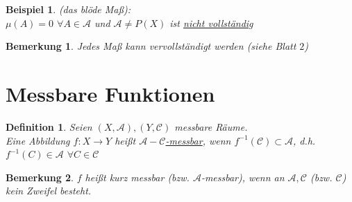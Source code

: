 \documentclass[11pt]{memoir}
\theoremstyle{changebreak}
\newtheorem{Definition}{Definition}[chapter]
\newtheorem{Bemerkung}{Bemerkung}[chapter]
\newtheorem{Beispiel}{Beispiel}[chapter]
\begin{document}
\begin{Beispiel}
(das blöde Maß): \\
$\mu(A) = 0$ $ \forall A \in \mathscr{A}$ und $\mathscr{A} \ne P(X)$ ist \underline{nicht vollständig}
\end{Beispiel}

\begin{Bemerkung}
Jedes Maß kann vervollständigt werden (siehe Blatt $2$)
\end{Bemerkung}


\section{Messbare Funktionen}

\begin{Definition}
Seien $(X, \mathscr{A}), (Y, \mathscr{C})$ messbare Räume.\\
 Eine Abbildung $f: X \rightarrow Y$ heißt \underline{$\mathscr{A}-\mathscr{C}$-messbar}, wenn $f^{-1}(\mathscr{C}) \subset \mathscr{A}$, d.h. $f^{-1}(C) \in \mathscr{A}$ $ \forall C \in \mathscr{C}$
\end{Definition}

\begin{Bemerkung}
$f$ heißt kurz messbar (bzw. $\mathscr{A}$-messbar), wenn an $\mathscr{A}, \mathscr{C}$ (bzw. $\mathscr{C}$) kein Zweifel besteht.
\end{Bemerkung}
\end{document}
